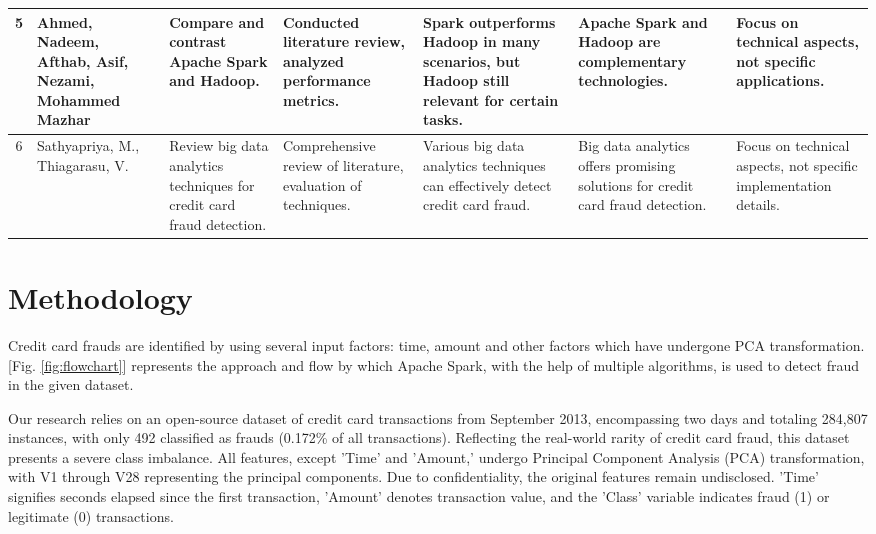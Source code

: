 \documentclass[journal]{IEEEtran}
\begin{document}
\begin{table}[btp]
\begin{tabular}{|c|p{1.7cm}|p{3.4cm}|p{2.2cm}|p{2.2cm}|p{2.2cm}|p{2.2cm}|}
        \hline
        5 & Ahmed, Nadeem, Afthab, Asif, Nezami, Mohammed Mazhar & Compare and contrast Apache Spark and Hadoop. & Conducted literature review, analyzed performance metrics. & Spark outperforms Hadoop in many scenarios, but Hadoop still relevant for certain tasks. & Apache Spark and Hadoop are complementary technologies. & Focus on technical aspects, not specific applications. \\
        \hline
        6 & Sathyapriya, M., Thiagarasu, V. & Review big data analytics techniques for credit card fraud detection. & Comprehensive review of literature, evaluation of techniques. & Various big data analytics techniques can effectively detect credit card fraud. & Big data analytics offers promising solutions for credit card fraud detection. & Focus on technical aspects, not specific implementation details. \\
        \hline
    \end{tabular}
    
\end{table}
\section{Methodology}
Credit card frauds are identified by using several input factors: time, amount and other factors which have undergone PCA transformation. [Fig. \ref{fig:flowchart}] represents the approach and flow by which Apache Spark, with the help of multiple algorithms, is used to detect fraud in the given dataset.

Our research relies on an open-source dataset of credit card transactions from September 2013, encompassing two days and totaling 284,807 instances, with only 492 classified as frauds (0.172\% of all transactions). Reflecting the real-world rarity of credit card fraud, this dataset presents a severe class imbalance. All features, except 'Time' and 'Amount,' undergo Principal Component Analysis (PCA) transformation, with V1 through V28 representing the principal components. Due to confidentiality, the original features remain undisclosed. 'Time' signifies seconds elapsed since the first transaction, 'Amount' denotes transaction value, and the 'Class' variable indicates fraud (1) or legitimate (0) transactions.
\end{document}
